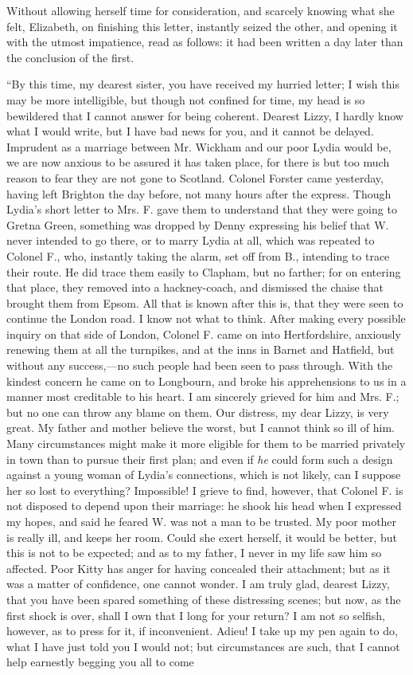 \documentclass[12pt]{book}
\begin{document}
Without allowing herself time for consideration, and scarcely knowing what she felt, Elizabeth, on finishing this letter, instantly seized the other, and opening it with the utmost impatience, read as follows: it had been written a day later than the conclusion of the first.

``By this time, my dearest sister, you have received my hurried letter; I wish this may be more intelligible, but though not confined for time, my head is so bewildered that I cannot answer for being coherent. Dearest Lizzy, I hardly know what I would write, but I have bad news for you, and it cannot be delayed. Imprudent as a marriage between Mr. Wickham and our poor Lydia would be, we are now anxious to be assured it has taken place, for there is but too much reason to fear they are not gone to Scotland. Colonel Forster came yesterday, having left Brighton the day before, not many hours after the express. Though Lydia's short letter to Mrs. F. gave them to understand that they were going to Gretna Green, something was dropped by Denny expressing his belief that W. never intended to go there, or to marry Lydia at all, which was repeated to Colonel F., who, instantly taking the alarm, set off from B., intending to trace their route. He did trace them easily to Clapham, but no farther; for on entering that place, they removed into a hackney-coach, and dismissed the chaise that brought them from Epsom. All that is known after this is, that they were seen to continue the London road. I know not what to think. After making every possible inquiry on that side of London, Colonel F. came on into Hertfordshire, anxiously renewing them at all the turnpikes, and at the inns in Barnet and Hatfield, but without any success,---no such people had been seen to pass through. With the kindest concern he came on to Longbourn, and broke his apprehensions to us in a manner most creditable to his heart. I am sincerely grieved for him and Mrs. F.; but no one can throw any blame on them. Our distress, my dear Lizzy, is very great. My father and mother believe the worst, but I cannot think so ill of him. Many circumstances might make it more eligible for them to be married privately in town than to pursue their first plan; and even if \textit{he} could form such a design against a young woman of Lydia's connections, which is not likely, can I suppose her so lost to everything? Impossible! I grieve to find, however, that Colonel F. is not disposed to depend upon their marriage: he shook his head when I expressed my hopes, and said he feared W. was not a man to be trusted. My poor mother is really ill, and keeps her room. Could she exert herself, it would be better, but this is not to be expected; and as to my father, I never in my life saw him so affected. Poor Kitty has anger for having concealed their attachment; but as it was a matter of confidence, one cannot wonder. I am truly glad, dearest Lizzy, that you have been spared something of these distressing scenes; but now, as the first shock is over, shall I own that I long for your return? I am not so selfish, however, as to press for it, if inconvenient. Adieu! I take up my pen again to do, what I have just told you I would not; but circumstances are such, that I cannot help earnestly begging you all to come 
\end{document}
